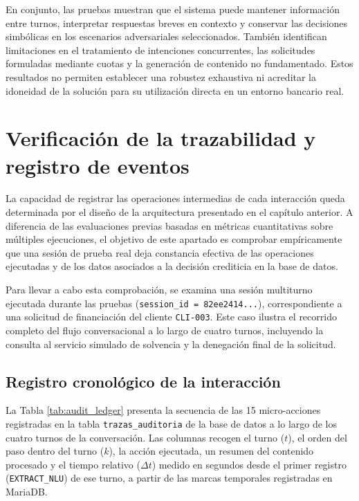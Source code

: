 \documentclass[12pt,a4paper]{report}
\begin{document}
En conjunto, las pruebas muestran que el sistema puede mantener información entre turnos, interpretar respuestas breves en contexto y conservar las decisiones simbólicas en los escenarios adversariales seleccionados. También identifican limitaciones en el tratamiento de intenciones concurrentes, las solicitudes formuladas mediante cuotas y la generación de contenido no fundamentado. Estos resultados no permiten establecer una robustez exhaustiva ni acreditar la idoneidad de la solución para su utilización directa en un entorno bancario real.

\section{Verificación de la trazabilidad y registro de eventos}

La capacidad de registrar las operaciones intermedias de cada interacción queda determinada por el diseño de la arquitectura presentado en el capítulo anterior. A diferencia de las evaluaciones previas basadas en métricas cuantitativas sobre múltiples ejecuciones, el objetivo de este apartado es comprobar empíricamente que una sesión de prueba real deja constancia efectiva de las operaciones ejecutadas y de los datos asociados a la decisión crediticia en la base de datos.

Para llevar a cabo esta comprobación, se examina una sesión multiturno ejecutada durante las pruebas (\texttt{session\_id = 82ee2414...}), correspondiente a una solicitud de financiación del cliente \texttt{CLI-003}. Este caso ilustra el recorrido completo del flujo conversacional a lo largo de cuatro turnos, incluyendo la consulta al servicio simulado de solvencia y la denegación final de la solicitud.

\subsection{Registro cronológico de la interacción}

La Tabla \ref{tab:audit_ledger} presenta la secuencia de las 15 micro-acciones registradas en la tabla \texttt{trazas\_auditoria} de la base de datos a lo largo de los cuatro turnos de la conversación. Las columnas recogen el turno ($t$), el orden del paso dentro del turno ($k$), la acción ejecutada, un resumen del contenido procesado y el tiempo relativo ($\Delta t$) medido en segundos desde el primer registro (\texttt{EXTRACT\_NLU}) de ese turno, a partir de las marcas temporales registradas en MariaDB.
\end{document}
